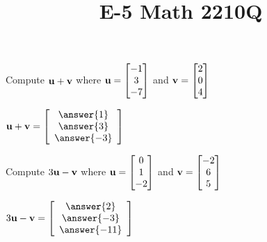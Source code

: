 \documentclass{ximera}
\newcommand{\bu}{{\bf u}}
\newcommand{\bv}{{\bf v}}
\begin{document}
  	\title{E-5  \hfill Math 2210Q} 

  	
  
 

  	 	\begin{question}
  
  	Compute $\bu+\bv$ where $\bu =	\begin{bmatrix}
  			-1\\3\\-7
  		\end{bmatrix}$ and $\bv = \begin{bmatrix}
  		2\\0\\4
  		\end{bmatrix}$
  		
  		$\bu +\bv = \left[\begin{array}{c}
  	\answer{1}\\\answer{3}\\\answer{-3}
  		\end{array}\right]$
  	
  		\end{question}
  		
  		\begin{question}
  	Compute $3\bu-\bv$ where $\bu =	\begin{bmatrix}
  	0\\1\\-2
  	\end{bmatrix}$ and $\bv = \begin{bmatrix}
  	-2\\6\\5
  	\end{bmatrix}$
  	
  	$3\bu -\bv = \left[\begin{array}{c}
  	\answer{2}\\\answer{-3}\\\answer{-11}
  \end{array}\right]$
  		
  	\end{question}
  	
\end{document}
